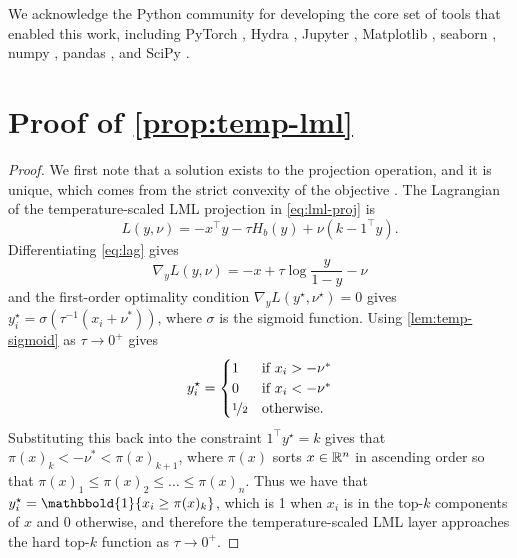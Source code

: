 \documentclass{article}
\begin{document}
We acknowledge the Python community
\citep{van1995python,oliphant2007python}
for developing
the core set of tools that enabled this work, including
PyTorch \citep{paszke2019pytorch},
Hydra \citep{hydra},
Jupyter \citep{kluyver2016jupyter},
Matplotlib \citep{hunter2007matplotlib},
seaborn \citep{seaborn},
numpy \citep{oliphant2006guide,van2011numpy},
pandas \citep{mckinney2012python}, and
SciPy \citep{jones2014scipy}.

{\footnotesize


}

\newpage
\appendix
\section{Proof of \cref{prop:temp-lml}}
\label{app:temp-lml-proof}

\begin{proof}
  We first note that a solution exists to the projection operation,
  and it is unique, which comes from the strict convexity
  of the objective \citep{rao1984convexity}.
  The Lagrangian of the temperature-scaled LML projection in \cref{eq:lml-proj} is
  \begin{equation}
  L(y, \nu) = -x^\top y - \tau H_b(y) + \nu(k - 1^\top y).
  \label{eq:lag}
  \end{equation}
  Differentiating \cref{eq:lag} gives
  \begin{equation}
  \nabla_y L(y, \nu) = -x + \tau \log \frac{y}{1-y}-\nu
  \end{equation}
  and the first-order optimality condition
  $\nabla_y L(y^\star, \nu^\star)=0$ gives
  $y^\star_i = \sigma(\tau^{-1}(x_i+\nu^*))$,
  where $\sigma$ is the sigmoid function.
  Using \cref{lem:temp-sigmoid} as $\tau\rightarrow 0^+$ gives
  \begin{equation}
    y^\star_i =
    \begin{cases}
      1 & \text{if } x_i > -\nu^* \\
      0 & \text{if } x_i < -\nu^* \\
      \nicefrac{1}{2} & \text{otherwise.}
    \end{cases}
  \end{equation}
  Substituting this back into the constraint $1^\top y^\star = k$
  gives that $\pi(x)_k < -\nu^* < \pi(x)_{k+1}$,
  where
  $\pi(x)$ sorts $x\in{\mathbb{R}}^n$ in ascending order so that
  $\pi(x)_1 \leq \pi(x)_2 \leq \ldots \leq \pi(x)_n.$
  Thus we have that $y^\star_i = \mathbbold{1}\{x_i\geq \pi(x)_k\}$,
  which is 1 when $x_i$ is in the top-$k$ components of $x$
  and 0 otherwise, and therefore the temperature-scaled LML layer
  approaches the hard top-$k$ function as
  $\tau\rightarrow 0^+$.
\end{proof}
\end{document}
